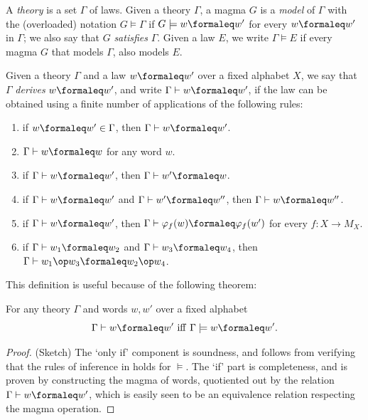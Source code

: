 \begin{definition}[Models]\label{models-def}
  \leanok
  A \emph{theory} is a set $\Gamma$ of laws.
  Given a theory $\Gamma$, a magma $G$ is a \emph{model} of $\Gamma$ with the
  (overloaded) notation $G\models\Gamma$ if $G\models w\formaleq w'$ for every $w\formaleq w'$ in $\Gamma$; we also say that $G$ \emph{satisfies} $\Gamma$.
  Given a law $E$, we write $\Gamma \models E$ if every magma $G$ that models $\Gamma$, also models $E$.
\end{definition}

\begin{definition}[Derivation]\label{derivation-def}
  \leanok
  Given a theory $\Gamma$ and a law $w\formaleq w'$ over a fixed alphabet $X$, we say that
  $\Gamma$ \emph{derives} $w\formaleq w'$, and write $\Gamma\vdash w\formaleq w'$, if the law can
  be obtained using a finite number of applications of the following rules:
  \begin{enumerate}
    \item if $w\formaleq w' \in \Gamma$, then $\Gamma\vdash w\formaleq w'$.
    \item $\Gamma\vdash w\formaleq w$ for any word $w$.
    \item if $\Gamma\vdash w\formaleq w'$, then $\Gamma\vdash w'\formaleq w$.
    \item if $\Gamma\vdash w\formaleq w'$ and $\Gamma\vdash w'\formaleq w''$, then $\Gamma\vdash w\formaleq w''$.
    \item if $\Gamma\vdash w\formaleq w'$, then $\Gamma\vdash \varphi_f(w) \formaleq \varphi_f(w')$ for every $f: X \to M_X$.
    \item if $\Gamma\vdash w_1\formaleq w_2$ and $\Gamma\vdash w_3\formaleq w_4$, then $\Gamma\vdash w_1 \op w_3\formaleq w_2\op w_4$.
  \end{enumerate}
\end{definition}

This definition is useful because of the following theorem:

\begin{theorem}\label{sound-complete}\leanok{}
  For any theory $\Gamma$ and words $w, w'$ over a fixed alphabet
  $$ \Gamma\vdash w\formaleq w'\ \mathrm{iff}\ \Gamma\models w\formaleq w'.$$
\end{theorem}

\begin{proof}
  \leanok
  (Sketch) The `only if' component is soundness, and follows from verifying that the rules of inference in  holds for $\models$. The `if' part is completeness, and is proven by constructing the magma of words, quotiented out by the relation $\Gamma \vdash w \formaleq w'$, which is easily seen to be an equivalence relation respecting the magma operation.
\end{proof}

